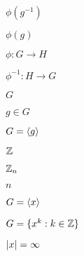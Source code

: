 \documentclass[10pt]{book}
\begin{document}
\begin{mdSnippets}
\begin{mdInlineSnippet}[91e143622b5d3124cbcef49cb3de0173]
$\phi(g^{-1})$\end{mdInlineSnippet}%
\begin{mdInlineSnippet}[464f4d0099bb51781f500b8560c47f63]%
$\phi(g)$\end{mdInlineSnippet}%
\begin{mdInlineSnippet}[245e4b87fe399dd2eb568a0c5e6f914b]%
$\phi: G \to H$\end{mdInlineSnippet}%
\begin{mdInlineSnippet}[58b66e35162ac2e66534683b024f3afe]%
$\phi^{-1}: H \to G$\end{mdInlineSnippet}%
\begin{mdInlineSnippet}[dfcf28d0734569a6a693bc8194de62bf]%
$G$\end{mdInlineSnippet}%
\begin{mdInlineSnippet}[c9742018c5575f06f59ce542b29ad79d]%
$g \in G$\end{mdInlineSnippet}%
\begin{mdInlineSnippet}[00568cd2e4e18026c987630a599c8945]%
$G = \ev{g}$\end{mdInlineSnippet}%
\begin{mdInlineSnippet}[1458a437b3c6456f9ebf61d46c9ed13e]%
$\mathbb{Z}$\end{mdInlineSnippet}%
\begin{mdInlineSnippet}%
$\mathbb{Z}_n$\end{mdInlineSnippet}%
\begin{mdInlineSnippet}[7b8b965ad4bca0e41ab51de7b31363a1]%
$n$\end{mdInlineSnippet}%
\begin{mdInlineSnippet}%
$G = \ev{x}$\end{mdInlineSnippet}%
\begin{mdInlineSnippet}[35ea5a669fa7fb281cab082240c4315b]%
$G = \{x^k: k \in \mathbb{Z}\}$\end{mdInlineSnippet}%
\begin{mdInlineSnippet}[5e4bb2f290033e9a6c38e33730f681b5]%
$\left\vert x\right\vert = \infty$\end{mdInlineSnippet}%
\begin{mdInlineSnippet}[11f4ab0a997134a58a350ced81f852b8]%

\end{mdInlineSnippet}
\end{mdSnippets}
\end{document}
